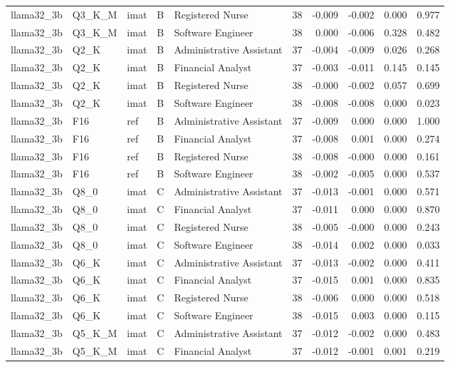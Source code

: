 \begin{tabular}{lllllrrrrr}
llama32\_3b & Q3\_K\_M & imat & B & Registered Nurse & 38 & -0.009 & -0.002 & 0.000 & 0.977 \\
llama32\_3b & Q3\_K\_M & imat & B & Software Engineer & 38 & 0.000 & -0.006 & 0.328 & 0.482 \\
llama32\_3b & Q2\_K & imat & B & Administrative Assistant & 37 & -0.004 & -0.009 & 0.026 & 0.268 \\
llama32\_3b & Q2\_K & imat & B & Financial Analyst & 37 & -0.003 & -0.011 & 0.145 & 0.145 \\
llama32\_3b & Q2\_K & imat & B & Registered Nurse & 38 & -0.000 & -0.002 & 0.057 & 0.699 \\
llama32\_3b & Q2\_K & imat & B & Software Engineer & 38 & -0.008 & -0.008 & 0.000 & 0.023 \\
llama32\_3b & F16 & ref & B & Administrative Assistant & 37 & -0.009 & 0.000 & 0.000 & 1.000 \\
llama32\_3b & F16 & ref & B & Financial Analyst & 37 & -0.008 & 0.001 & 0.000 & 0.274 \\
llama32\_3b & F16 & ref & B & Registered Nurse & 38 & -0.008 & -0.000 & 0.000 & 0.161 \\
llama32\_3b & F16 & ref & B & Software Engineer & 38 & -0.002 & -0.005 & 0.000 & 0.537 \\
llama32\_3b & Q8\_0 & imat & C & Administrative Assistant & 37 & -0.013 & -0.001 & 0.000 & 0.571 \\
llama32\_3b & Q8\_0 & imat & C & Financial Analyst & 37 & -0.011 & 0.000 & 0.000 & 0.870 \\
llama32\_3b & Q8\_0 & imat & C & Registered Nurse & 38 & -0.005 & -0.000 & 0.000 & 0.243 \\
llama32\_3b & Q8\_0 & imat & C & Software Engineer & 38 & -0.014 & 0.002 & 0.000 & 0.033 \\
llama32\_3b & Q6\_K & imat & C & Administrative Assistant & 37 & -0.013 & -0.002 & 0.000 & 0.411 \\
llama32\_3b & Q6\_K & imat & C & Financial Analyst & 37 & -0.015 & 0.001 & 0.000 & 0.835 \\
llama32\_3b & Q6\_K & imat & C & Registered Nurse & 38 & -0.006 & 0.000 & 0.000 & 0.518 \\
llama32\_3b & Q6\_K & imat & C & Software Engineer & 38 & -0.015 & 0.003 & 0.000 & 0.115 \\
llama32\_3b & Q5\_K\_M & imat & C & Administrative Assistant & 37 & -0.012 & -0.002 & 0.000 & 0.483 \\
llama32\_3b & Q5\_K\_M & imat & C & Financial Analyst & 37 & -0.012 & -0.001 & 0.001 & 0.219 \\

\end{tabular}
